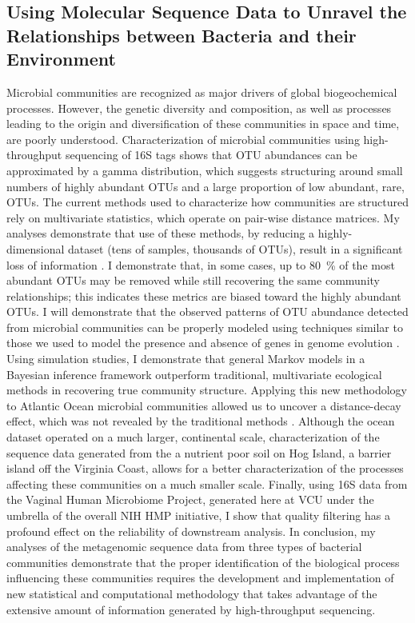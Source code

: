 
\subsection*{Using Molecular Sequence Data to Unravel the Relationships between Bacteria 
and their Environment}

Microbial communities are recognized as major drivers of global biogeochemical processes.  However, 
the genetic diversity and composition, as well as processes leading to the origin and diversification of these 
communities in space and time, are poorly understood.  Characterization of microbial communities using 
high-throughput sequencing of 16S tags shows that OTU abundances can be approximated by a gamma distribution, 
which suggests structuring around small numbers of highly abundant OTUs and a large proportion of low abundant, 
rare, OTUs.  The current methods used to characterize how communities are structured rely on multivariate statistics, 
which operate on pair-wise distance matrices.  My analyses demonstrate that use of these methods, by reducing a 
highly-dimensional dataset (tens of samples, thousands of OTUs), result in a significant loss of information 
\citep{Friedline:2012fm}. I demonstrate that, in some cases, up to \SI{80}{\percent} of the most abundant OTUs may be removed while 
still recovering the same community relationships; this indicates these metrics are biased toward the highly abundant OTUs.  I 
will demonstrate that the observed patterns of OTU abundance detected from microbial communities can be properly 
modeled using techniques similar to those we used to model the presence and absence of genes in genome 
evolution \citep{Lake:2004cy, Rivera:2004ct}.  Using simulation studies, I demonstrate that general Markov models 
in a Bayesian inference framework outperform traditional, multivariate ecological methods in recovering true community 
structure.  Applying this new methodology to Atlantic Ocean microbial communities allowed us to uncover a distance-decay 
effect, which was not revealed by the traditional methods \citep{Friedline:2012fm}.  Although the ocean dataset operated on a 
much larger, continental scale, characterization of the sequence data generated from the a nutrient poor soil on Hog Island, 
a barrier island off the Virginia Coast, allows for a better characterization of the processes affecting these communities 
on a much smaller scale.  Finally, using 16S data from the Vaginal Human 
Microbiome Project, generated here at VCU under the umbrella of the overall NIH HMP initiative, I show that 
quality filtering has a profound effect on the reliability of downstream analysis.  In conclusion, 
my analyses of the metagenomic sequence data from three types of bacterial communities demonstrate that the proper 
identification of the biological process influencing these communities requires the development and implementation of 
new statistical and computational methodology that takes advantage of the extensive amount of information generated by 
high-throughput sequencing. 


